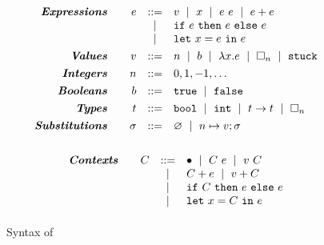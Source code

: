 \begin{figure}
$$
\begin{array}{rrcl}
\emphbf{Expressions} \quad
  & e & ::=    & v \spmid x \spmid \eapp{e}{e} \spmid \eplus{e}{e}\\
  &   & \spmid & \eif{e}{e}{e} \\
  &   & \spmid & \elet{x}{e}{e} \\[0.05in]

\emphbf{Values} \quad
  & v & ::= &  n \spmid b \spmid \efun{x}{e} \spmid \ehole{n} \spmid \stuck \\[0.05in]

\emphbf{Integers} \quad
  & n & ::= &  0,1,-1,\ldots \\[0.05in]

\emphbf{Booleans} \quad
  & b & ::= &  \etrue \spmid \efalse \\[0.05in]

\emphbf{Types} \quad
  & t & ::= & \tbool \spmid \tint \spmid \tfun{t}{t} \spmid \thole{n} \\[0.05in]

\emphbf{Substitutions} \quad
  & \vsu & ::= & \emptysu \spmid \mksub{n}{v}; \vsu \\[0.1in]
\end{array}
$$

$$
\begin{array}{rrcl}
\textbf{\emph{Contexts}} \quad
  & C
  & ::=
  &   	 \bullet
  \ \mid \  C \ e
  \ \mid \  v \ C \\
  & & \ \mid \  & C + e \ \mid \  v + C \\
  & & \ \mid \  & \mathtt{if}\ C\ \mathtt{then}\ e\ \mathtt{else}\ e \\
  & & \ \mid \  & \mathtt{let}\ x = C\ \mathtt{in}\ e
  \\[0.05in]
\end{array}
$$



\caption{Syntax of \lang}
\label{fig:syntax}
\end{figure}
